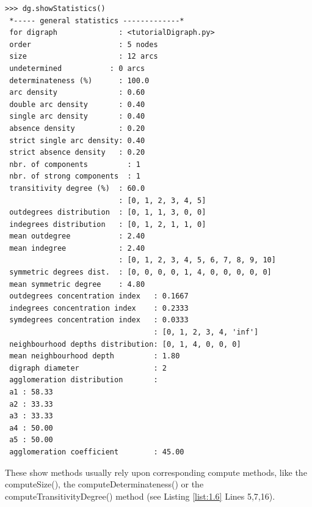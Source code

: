 \begin{lstlisting}[caption={Inspecting a \texttt{Digraph} object},label=list:1.5]
>>> dg.showStatistics()
 *----- general statistics -------------*
 for digraph              : <tutorialDigraph.py>
 order                    : 5 nodes
 size                     : 12 arcs
 undetermined           : 0 arcs
 determinateness (%)      : 100.0
 arc density              : 0.60
 double arc density       : 0.40
 single arc density       : 0.40
 absence density          : 0.20
 strict single arc density: 0.40
 strict absence density   : 0.20
 nbr. of components         : 1
 nbr. of strong components  : 1
 transitivity degree (%)  : 60.0
                          : [0, 1, 2, 3, 4, 5]
 outdegrees distribution  : [0, 1, 1, 3, 0, 0]
 indegrees distribution   : [0, 1, 2, 1, 1, 0]
 mean outdegree           : 2.40
 mean indegree            : 2.40
                          : [0, 1, 2, 3, 4, 5, 6, 7, 8, 9, 10]
 symmetric degrees dist.  : [0, 0, 0, 0, 1, 4, 0, 0, 0, 0, 0]
 mean symmetric degree    : 4.80
 outdegrees concentration index   : 0.1667
 indegrees concentration index    : 0.2333
 symdegrees concentration index   : 0.0333
                                  : [0, 1, 2, 3, 4, 'inf']
 neighbourhood depths distribution: [0, 1, 4, 0, 0, 0]
 mean neighbourhood depth         : 1.80
 digraph diameter                 : 2
 agglomeration distribution       :
 a1 : 58.33
 a2 : 33.33
 a3 : 33.33
 a4 : 50.00
 a5 : 50.00
 agglomeration coefficient        : 45.00
\end{lstlisting}

These show methods usually rely upon corresponding compute methods, like the computeSize(), the computeDeterminateness() or the computeTransitivityDegree() method (see Listing \ref{list:1.6} Lines 5,7,16).

